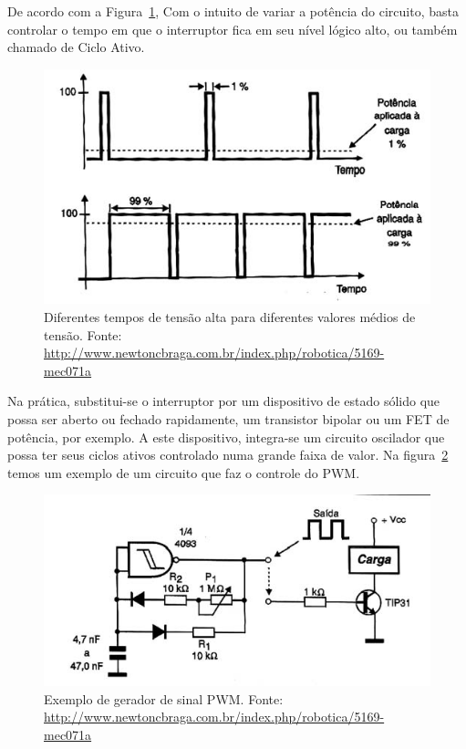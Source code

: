 De acordo com a Figura~\ref{fig:PWM3}, Com o intuito de variar a potência do circuito, basta controlar o tempo em que o interruptor fica em seu nível lógico alto, ou também chamado de Ciclo Ativo.


\FloatBarrier
\begin{figure}[!htbp]
	\centering
	\includegraphics[scale=0.7]{imagens/PWM3}
	\caption{Diferentes tempos de tensão alta para diferentes valores médios de tensão. Fonte: \url{http://www.newtoncbraga.com.br/index.php/robotica/5169-mec071a}	 }%
	
	\label{fig:PWM3}
\end{figure}
\FloatBarrier


Na prática, substitui-se o interruptor por um dispositivo de estado sólido que possa ser aberto ou fechado rapidamente, um transistor bipolar ou um FET de potência, por exemplo. A este dispositivo, integra-se um circuito oscilador que possa ter seus ciclos ativos controlado numa grande faixa de valor.
Na figura~\ref{fig:PWM4} temos um exemplo de um circuito que faz o controle do PWM.

\FloatBarrier
\begin{figure}[!htbp]
	\centering
	\includegraphics[scale=0.7]{imagens/PWM4}
	\caption{Exemplo de gerador de sinal PWM. Fonte: \url{http://www.newtoncbraga.com.br/index.php/robotica/5169-mec071a} }%
	
	\label{fig:PWM4}
\end{figure}
\FloatBarrier

